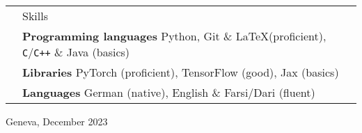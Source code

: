 \documentclass[11pt, a4paper]{article}
\newcommand{\headingfont}{\Large\color{OliveGreen}}
\newenvironment{SectionTable}[1]{
	\renewcommand*{\arraystretch}{1.7}
	\setlength{\tabcolsep}{10pt}
	\begin{longtable}{Rp{5.2in}} & #1 \\}
	{\end{longtable}\vspace{-.3cm}}
\begin{document}
    \begin{SectionTable}{\headingfont Skills}
		& \textbf{Programming languages} \newline
		Python, Git \& \LaTeX (proficient), \texttt{C}/\texttt{C++} \& Java (basics) \\
        
        & \textbf{Libraries} \newline
        PyTorch (proficient), TensorFlow (good), Jax (basics) \\
		
		& \textbf{Languages} \newline
		German (native), English \& Farsi/Dari (fluent)
	\end{SectionTable}
		
	\vspace{0.6cm}
	Geneva, December 2023
	
\end{document}

